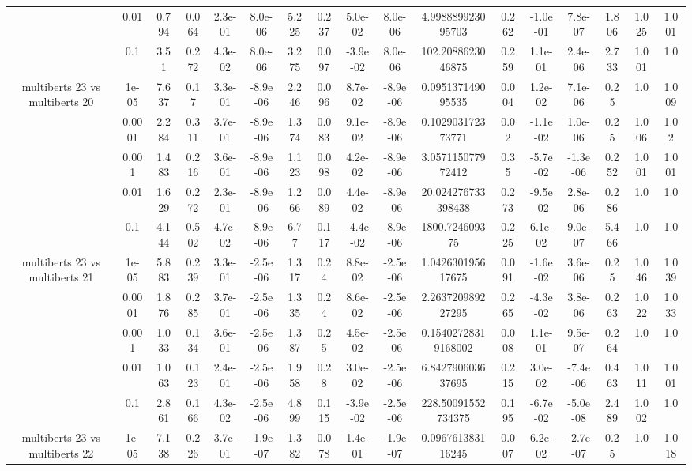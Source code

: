 \begin{tabular}{|c|c|c|c|c|c|c|c|c|c|c|c|c|c|c|c|c|}
 & 0.01 & 0.794 & 0.064 & 2.3e-01 & 8.0e-06 & 5.225 & 0.237 & 5.0e-02 & 8.0e-06 & 4.998889923095703 & 0.262 & -1.0e-01 & 7.8e-07 & 1.806 & 1.025 & 1.001 \\
 & 0.1 & 3.51 & 0.272 & 4.3e-02 & 8.0e-06 & 3.275 & 0.097 & -3.9e-02 & 8.0e-06 & 102.2088623046875 & 0.259 & 1.1e-01 & 2.4e-06 & 2.733 & 1.001 & 1.0 \\
\hline
\multirow{5}{*}{multiberts 23 vs multiberts 20} & 1e-05 & 7.637 & 0.17 & 3.3e-01 & -8.9e-06 & 2.246 & 0.096 & 8.7e-02 & -8.9e-06 & 0.095137149095535 & 0.004 & 1.2e-02 & 7.1e-06 & 0.25 & 1.0 & 1.009 \\
 & 0.0001 & 2.284 & 0.311 & 3.7e-01 & -8.9e-06 & 1.374 & 0.083 & 9.1e-02 & -8.9e-06 & 0.102903172373771 & 0.02 & -1.1e-02 & 1.0e-06 & 0.25 & 1.006 & 1.02 \\
 & 0.001 & 1.483 & 0.216 & 3.6e-01 & -8.9e-06 & 1.123 & 0.098 & 4.2e-02 & -8.9e-06 & 3.057115077972412 & 0.35 & -5.7e-02 & -1.3e-06 & 0.252 & 1.001 & 1.001 \\
 & 0.01 & 1.629 & 0.272 & 2.3e-01 & -8.9e-06 & 1.266 & 0.089 & 4.4e-02 & -8.9e-06 & 20.024276733398438 & 0.273 & -9.5e-02 & 2.8e-06 & 0.286 & 1.0 & 1.0 \\
 & 0.1 & 4.144 & 0.502 & 4.7e-02 & -8.9e-06 & 6.77 & 0.117 & -4.4e-02 & -8.9e-06 & 1800.724609375 & 0.225 & 6.1e-02 & 9.0e-07 & 5.466 & 1.0 & 1.0 \\
\hline
\multirow{5}{*}{multiberts 23 vs multiberts 21} & 1e-05 & 5.883 & 0.239 & 3.3e-01 & -2.5e-06 & 1.317 & 0.24 & 8.8e-02 & -2.5e-06 & 1.042630195617675 & 0.091 & -1.6e-02 & 3.6e-06 & 0.25 & 1.046 & 1.039 \\
 & 0.0001 & 1.876 & 0.285 & 3.7e-01 & -2.5e-06 & 1.335 & 0.24 & 8.6e-02 & -2.5e-06 & 2.263720989227295 & 0.265 & -4.3e-02 & 3.8e-06 & 0.263 & 1.022 & 1.033 \\
 & 0.001 & 1.033 & 0.134 & 3.6e-01 & -2.5e-06 & 1.387 & 0.25 & 4.5e-02 & -2.5e-06 & 0.15402728319168002 & 0.008 & 1.1e-01 & 9.5e-07 & 0.264 & 1.0 & 1.0 \\
 & 0.01 & 1.063 & 0.123 & 2.4e-01 & -2.5e-06 & 1.958 & 0.28 & 3.0e-02 & -2.5e-06 & 6.842790603637695 & 0.215 & 3.0e-02 & -7.4e-06 & 0.463 & 1.011 & 1.001 \\
 & 0.1 & 2.861 & 0.166 & 4.3e-02 & -2.5e-06 & 4.899 & 0.115 & -3.9e-02 & -2.5e-06 & 228.50091552734375 & 0.195 & -6.7e-02 & -5.0e-08 & 2.489 & 1.002 & 1.0 \\
\hline
\multirow{5}{*}{multiberts 23 vs multiberts 22} & 1e-05 & 7.138 & 0.226 & 3.7e-01 & -1.9e-07 & 1.382 & 0.078 & 1.4e-01 & -1.9e-07 & 0.096761383116245 & 0.007 & 6.2e-02 & -2.7e-07 & 0.25 & 1.0 & 1.018 \\

\end{tabular}

